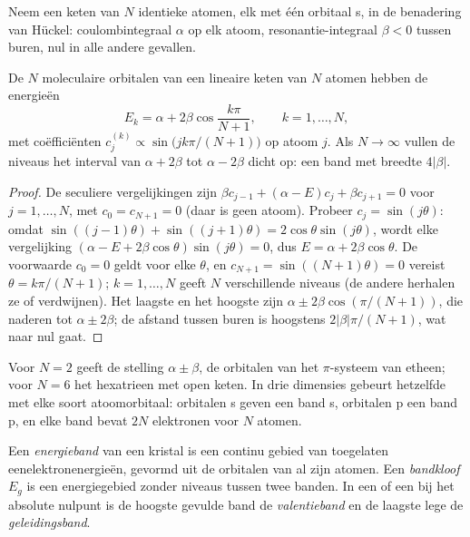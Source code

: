Neem een keten van $N$ identieke atomen, elk met één orbitaal s, in de
benadering van Hückel: coulombintegraal $\alpha$ op elk atoom, resonantie-integraal $\beta < 0$
tussen buren, nul in alle andere gevallen.

\begin{theorem}\label{thm:b3:solid-state:chain}
De $N$ moleculaire orbitalen van een lineaire keten van $N$ atomen hebben de energieën
\[
  E_k = \alpha + 2\beta\cos\frac{k\pi}{N + 1}, \qquad k = 1, \dots, N,
\]
met coëfficiënten $c_j^{(k)} \propto \sin\bigl(jk\pi/(N + 1)\bigr)$ op atoom $j$. Als $N \to \infty$ vullen de niveaus het
interval van $\alpha + 2\beta$ tot $\alpha - 2\beta$ dicht op: een band met breedte $4|\beta|$.
\end{theorem}

\begin{proof}
De seculiere vergelijkingen zijn $\beta c_{j-1} + (\alpha - E)c_j + \beta c_{j+1} = 0$ voor $j = 1, \dots, N$, met $c_0 = c_{N+1} = 0$
(daar is geen atoom). Probeer $c_j = \sin(j\theta)$: omdat $\sin((j - 1)\theta) + \sin((j + 1)\theta) = 2\cos\theta\sin(j\theta)$, wordt elke
vergelijking $(\alpha - E + 2\beta\cos\theta)\sin(j\theta) = 0$, dus $E = \alpha + 2\beta\cos\theta$. De voorwaarde $c_0 = 0$ geldt
voor elke $\theta$, en $c_{N+1} = \sin((N + 1)\theta) = 0$ vereist $\theta = k\pi/(N + 1)$; $k = 1, \dots, N$ geeft $N$ verschillende
niveaus (de andere herhalen ze of verdwijnen). Het laagste en het
hoogste zijn
$\alpha \pm 2\beta\cos(\pi/(N + 1))$, die naderen tot $\alpha \pm 2\beta$; de afstand tussen buren is hoogstens
$2|\beta|\pi/(N + 1)$, wat naar nul gaat.
\end{proof}

Voor $N = 2$ geeft de stelling $\alpha \pm \beta$, de orbitalen van het $\pi$-systeem van etheen; voor
$N = 6$ het hexatrieen met open keten. In drie dimensies gebeurt hetzelfde met
elke soort atoomorbitaal: orbitalen s geven een band s, orbitalen p een
band p, en elke band bevat $2N$ elektronen voor $N$ atomen.

\begin{definition}[Banden]\label{def:b3:solid-state:band}
Een \emph{energieband} van een kristal is een
continu gebied van toegelaten eenelektronenergieën, gevormd uit de
orbitalen van al zijn atomen. Een
\emph{bandkloof} $E_g$ is een energiegebied zonder niveaus tussen twee
banden. In een  of een  bij het absolute nulpunt is
de hoogste gevulde band de \emph{valentieband} en de
laagste lege de \emph{geleidingsband}.
\end{definition}


